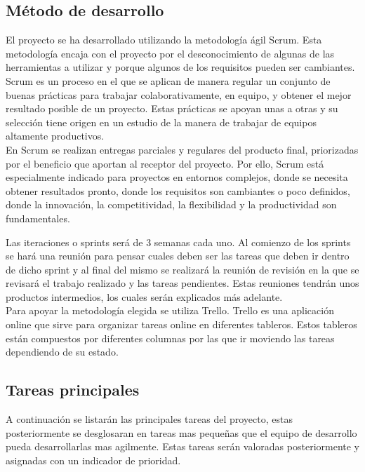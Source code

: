 \subsection{Método de desarrollo}
El proyecto se ha desarrollado utilizando la metodología ágil Scrum\cite{scrum}. Esta metodología encaja con el proyecto por el desconocimiento de algunas de las herramientas a utilizar y porque algunos de los requisitos pueden ser cambiantes.\\

Scrum es un proceso en el que se aplican de manera regular un conjunto de buenas prácticas para trabajar colaborativamente, en equipo, y obtener el mejor resultado posible de un proyecto. Estas prácticas se apoyan unas a otras y su selección tiene origen en un estudio de la manera de trabajar de equipos altamente productivos.\\

En Scrum se realizan entregas parciales y regulares del producto final, priorizadas por el beneficio que aportan al receptor del proyecto. Por ello, Scrum está especialmente indicado para proyectos en entornos complejos, donde se necesita obtener resultados pronto, donde los requisitos son cambiantes o poco definidos, donde la innovación, la competitividad, la flexibilidad y la productividad son fundamentales.\\


Las iteraciones o sprints será de 3 semanas cada uno. Al comienzo de los sprints se hará una reunión para pensar cuales deben ser las tareas que deben ir dentro de dicho sprint y al final del mismo se realizará la reunión de revisión en la que se revisará el trabajo realizado y las tareas pendientes. Estas reuniones tendrán unos productos intermedios, los cuales serán explicados más adelante.\\

Para apoyar la metodología elegida se utiliza Trello\cite{trello}. Trello es una aplicación online que sirve para organizar tareas online en diferentes tableros. Estos tableros están compuestos por diferentes columnas por las que ir moviendo las tareas dependiendo de su estado.

\subsection{Tareas principales}
A continuación se listarán las principales tareas del proyecto, estas posteriormente se desglosaran en tareas mas pequeñas que el equipo de desarrollo pueda desarrollarlas mas agilmente. Estas tareas serán valoradas posteriormente y asignadas con un indicador de prioridad.

